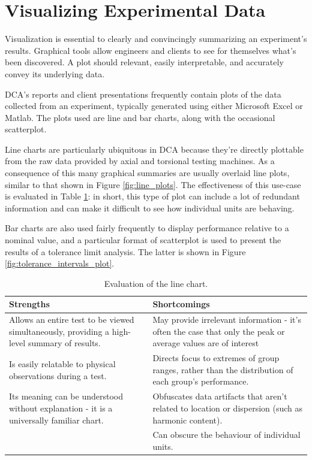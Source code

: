 \documentclass[11pt,a4paper,article]{memoir} %
\begin{document}
\section{Visualizing Experimental Data}
Visualization is essential to clearly and convincingly summarizing an experiment's results. Graphical tools allow engineers and clients to see for themselves what's been discovered. A plot should relevant, easily interpretable, and accurately convey its underlying data.
\par
DCA's reports and client presentations frequently contain plots of the data collected from an experiment, typically generated using either Microsoft Excel or Matlab. The plots used are line and bar charts, along with the occasional scatterplot.
\par
Line charts are particularly ubiquitous in DCA because they're directly plottable from the raw data provided by axial and torsional testing machines. As a consequence of this many graphical summaries are usually overlaid line plots, similar to that shown in Figure \ref{fig:line_plots}. The effectiveness of this use-case is evaluated in Table \ref{tab:line_chart}: in short, this type of plot can include a lot of redundant information and can make it difficult to see how individual units are behaving.
\par
Bar charts are also used fairly frequently to display performance relative to a nominal value, and a particular format of scatterplot is used to present the results of a tolerance limit analysis. The latter is shown in Figure \ref{fig:tolerance_intervals_plot}. 
\begin{table}[h!]
\caption{Evaluation of the line chart.}
\small
\hspace*{-.5cm}
\begin{tabular}{p{6.5cm}p{6.5cm}}
\toprule
\textbf{Strengths}	&	\textbf{Shortcomings} \\
\toprule
Allows an entire test to be viewed simultaneously, providing a high-level summary of results.	&	May provide irrelevant information - it's often the case that only the peak or average values are of interest	\\
Is easily relatable to physical observations during a test.	&	Directs focus to extremes of group ranges, rather than the distribution of each group's performance.	\\
Its meaning can be understood without explanation - it is a universally familiar chart.	&  Obfuscates data artifacts that aren't related to location or dispersion (such as harmonic content). \\
&  Can obscure the behaviour of individual units. 			\\
\bottomrule
\end{tabular}
\label{tab:line_chart}
\end{table}
\end{document}

